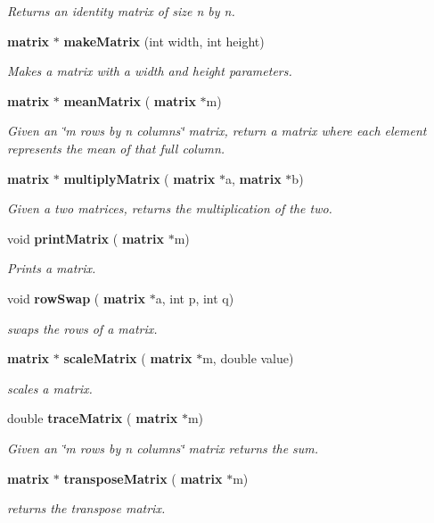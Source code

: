 \begin{DoxyCompactItemize}
\begin{DoxyCompactList}\small\item\em Returns an identity matrix of size n by n. \end{DoxyCompactList}\item 
\textbf{ matrix} $\ast$ \textbf{ make\+Matrix} (int width, int height)
\begin{DoxyCompactList}\small\item\em Makes a matrix with a width and height parameters. \end{DoxyCompactList}\item 
\textbf{ matrix} $\ast$ \textbf{ mean\+Matrix} (\textbf{ matrix} $\ast$m)
\begin{DoxyCompactList}\small\item\em Given an \char`\"{}m rows by n columns\char`\"{} matrix, return a matrix where each element represents the mean of that full column. \end{DoxyCompactList}\item 
\textbf{ matrix} $\ast$ \textbf{ multiply\+Matrix} (\textbf{ matrix} $\ast$a, \textbf{ matrix} $\ast$b)
\begin{DoxyCompactList}\small\item\em Given a two matrices, returns the multiplication of the two. \end{DoxyCompactList}\item 
void \textbf{ print\+Matrix} (\textbf{ matrix} $\ast$m)
\begin{DoxyCompactList}\small\item\em Prints a matrix. \end{DoxyCompactList}\item 
void \textbf{ row\+Swap} (\textbf{ matrix} $\ast$a, int p, int q)
\begin{DoxyCompactList}\small\item\em swaps the rows of a matrix. \end{DoxyCompactList}\item 
\textbf{ matrix} $\ast$ \textbf{ scale\+Matrix} (\textbf{ matrix} $\ast$m, double value)
\begin{DoxyCompactList}\small\item\em scales a matrix. \end{DoxyCompactList}\item 
double \textbf{ trace\+Matrix} (\textbf{ matrix} $\ast$m)
\begin{DoxyCompactList}\small\item\em Given an \char`\"{}m rows by n columns\char`\"{} matrix returns the sum. \end{DoxyCompactList}\item 
\textbf{ matrix} $\ast$ \textbf{ transpose\+Matrix} (\textbf{ matrix} $\ast$m)
\begin{DoxyCompactList}\small\item\em returns the transpose matrix. \end{DoxyCompactList}\end{DoxyCompactItemize}


